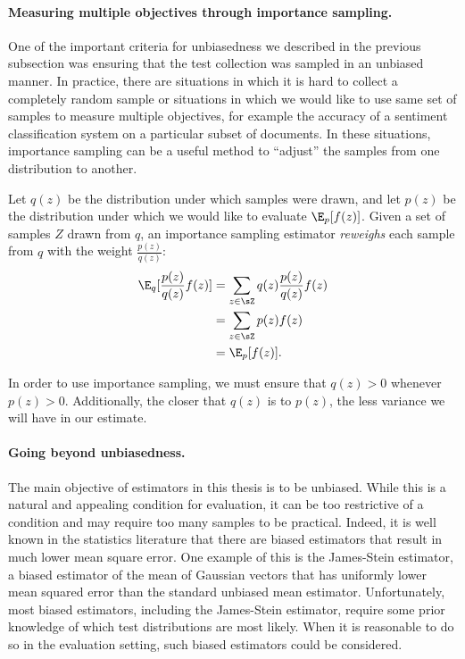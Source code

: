 \paragraph{Measuring multiple objectives through importance sampling.}
One of the important criteria for unbiasedness we described in the previous subsection was ensuring that the test collection was sampled in an unbiased manner.
In practice, there are situations in which it is hard to collect a completely random sample or situations in which we would like to use same set of samples to measure multiple objectives, for example the accuracy of a sentiment classification system on a particular subset of documents.
In these situations, importance sampling can be a useful method to ``adjust'' the samples from one distribution to another.

Let $q(z)$ be the distribution under which samples were drawn, and let $p(z)$ be the distribution under which we would like to evaluate $\E_p[f(z)]$.
Given a set of samples $Z$ drawn from $q$, an importance sampling estimator \textit{reweighs} each sample from $q$ with the weight $\frac{p(z)}{q(z)}$:
\begin{align}
  \E_q[\frac{p(z)}{q(z)} f(z)] 
  &= \sum_{z \in \sZ} q(z) \frac{p(z)}{q(z)} f(z) \\
  &= \sum_{z \in \sZ} p(z) f(z) \\
  &= \E_p[f(z)].
\end{align}

In order to use importance sampling, we must ensure that $q(z) > 0$ whenever $p(z) > 0$.
Additionally, the closer that $q(z)$ is to $p(z)$, the less variance we will have in our estimate.

\paragraph{Going beyond unbiasedness.}
The main objective of estimators in this thesis is to be unbiased.
While this is a natural and appealing condition for evaluation, it can be too restrictive of a condition and may require too many samples to be practical.
Indeed, it is well known in the statistics literature that there are biased estimators that result in much lower mean square error.
One example of this is the James-Stein estimator, a biased estimator of the mean of Gaussian vectors that has uniformly lower mean squared error than the standard unbiased mean estimator.
Unfortunately, most biased estimators, including the James-Stein estimator, require some prior knowledge of which test distributions are most likely.
When it is reasonable to do so in the evaluation setting, such biased estimators could be considered.
